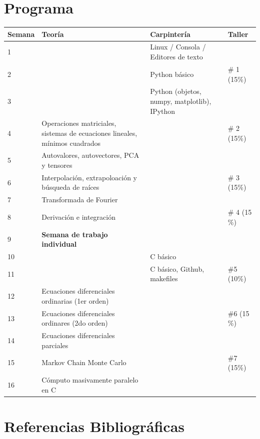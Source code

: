 \documentclass[11pt]{article}
\begin{document}
 

\section*{Programa}

\begin{center}
\begin{tabular}{|p{1.6cm}|p{7.0cm}|p{4.0cm}|p{2.5cm}|}
\hline

Semana & Teor\'ia & Carpinter\'ia & Taller \\\hline
1 &     & Linux / Consola / Editores de texto & \\\hline
2 & 	& Python b\'asico & \# 1 (15\%) \\\hline
3 & 	& Python (objetos, numpy, matplotlib), IPython& \\\hline 
4 & 	Operaciones matriciales, sistemas de ecuaciones lineales,
m\'inimos cuadrados & &  \# 2 (15\%) \\\hline
5 &  Autovalores, autovectores, PCA y tensores& & \\\hline
6 &  Interpolaci\'on, extrapoloaci\'on y b\'usqueda de ra\'ices & & \#
3 (15\%)\\\hline
7 &  Transformada de Fourier & & \\ \hline
8 & Derivaci\'on e integraci\'on &  & \# 4 (15 \%)\\\hline
9 & {\bf Semana de trabajo individual} & &\\\hline
10 & & C b\'asico &  \\\hline
11 & & C b\'asico, Github, makefiles & \#5 (10\%) \\\hline
12 & Ecuaciones diferenciales ordinarias (1er orden)& & \\\hline 
13 & Ecuaciones diferenciales ordinares (2do orden)& & \#6 (15 \%)\\\hline
14 & Ecuaciones diferenciales parciales &  & \\\hline
15 & Markov Chain Monte Carlo &   & \#7 (15\%) \\\hline
16 & C\'omputo masivamente paralelo en C &    & \\\hline
\hline
\end{tabular}
\end{center}

\newpage

\section*{Referencias Bibliogr\'aficas}
\end{document}
